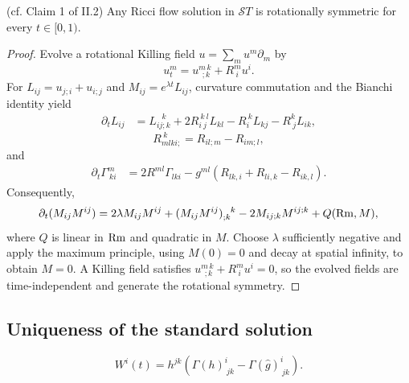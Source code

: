 \begin{lemma}
  \label{lem:kl-rotational-symmetry-standard-solutions-standard-solutions-lemma}
 (cf. Claim 1 of II.2)
Any Ricci flow solution in ${\mathcal ST}$ is rotationally symmetric for every
$t\in[0,1)$.
\end{lemma}
\begin{proof}
\sketch Evolve a rotational Killing field $u=\sum_m u^m\partial_m$ by
\begin{equation} \label{Killingevolution}
u_t^m=u^{m\,k}_{\ \ ;k}+R^m_{\ i}u^i.
\end{equation}
For $L_{ij}=u_{j;i}+u_{i;j}$ and $M_{ij}=e^{\lambda t}L_{ij}$, curvature
commutation and the Bianchi identity yield
\begin{align} \label{bigmess1}
\partial_tL_{ij}&=L_{ij;k}^{\ \ \ k}+2R^{\ k\ l}_{i\ j}L_{kl}-R_i^{\ k}L_{kj}-R^k_{\ j}L_{ik},
\end{align}
\begin{equation} \label{bigmess2}
R_{mlki;}^{\ k}=R_{il;m}-R_{im;l},
\end{equation}
and
\begin{align} \label{bigmess3}
\partial_t\Gamma^m_{\ ki}&=2R^{ml}\Gamma_{lki}-g^{ml}(R_{lk,i}+R_{li,k}-R_{ik,l}).
\end{align}
Consequently,
\begin{equation} \label{M2}
\partial_t(M_{ij}M^{ij})=2\lambda M_{ij}M^{ij}+(M_{ij}M^{ij})_{;k}^{\ \ k}
-2M_{ij;k}M^{ij;k}+Q(\Rm,M),
\end{equation}
where $Q$ is linear in $\operatorname{Rm}$ and quadratic in $M$. Choose $\lambda$ sufficiently
negative and apply the maximum principle, using $M(0)=0$ and decay at spatial
infinity, to obtain $M=0$. A Killing field satisfies
$u^{m\,k}_{\ \ ;k}+R^m_{\ i}u^i=0$, so the evolved fields are time-independent
and generate the rotational symmetry.
\end{proof}

\subsection{Uniqueness of the standard solution}
 \label{claim3}

\begin{equation} \label{Weqn}
W^i(t)=h^{jk}\left(\Gamma(h)^i_{\ jk}-\Gamma(\widehat g)^i_{\ jk}\right).
\end{equation}


